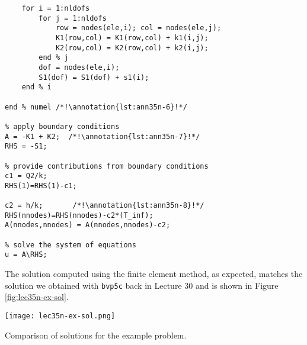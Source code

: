 \begin{lstlisting}[style=myMatlab,name=lec35n-ex]
    % add local arrays to global arrays "assembly"
    for i = 1:nldofs
        for j = 1:nldofs
            row = nodes(ele,i); col = nodes(ele,j);
            K1(row,col) = K1(row,col) + k1(i,j);
            K2(row,col) = K2(row,col) + k2(i,j);
        end % j
        dof = nodes(ele,i);
        S1(dof) = S1(dof) + s1(i);
    end % i

end % numel /*!\annotation{lst:ann35n-6}!*/

% apply boundary conditions
A = -K1 + K2;  /*!\annotation{lst:ann35n-7}!*/
RHS = -S1;

% provide contributions from boundary conditions
c1 = Q2/k;
RHS(1)=RHS(1)-c1;

c2 = h/k;       /*!\annotation{lst:ann35n-8}!*/
RHS(nnodes)=RHS(nnodes)-c2*(T_inf);
A(nnodes,nnodes) = A(nnodes,nnodes)-c2;

% solve the system of equations
u = A\RHS;
\end{lstlisting}

The solution computed using the finite element method, as expected, matches the solution we obtained with \lstinline[style=myMatlab]{bvp5c} back in Lecture 30 and is shown in Figure \ref{fig:lec35n-ex-sol}.
\begin{marginfigure}
\texttt{[image: lec35n-ex-sol.png]}
\caption{Comparison of solutions for the example problem.}
\label{fig:lec35n-ex-sol}
\end{marginfigure}

